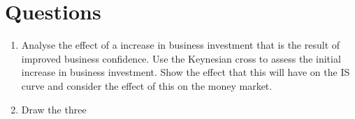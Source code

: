 \documentclass{article}
\begin{document}
\section{Questions}
\begin{enumerate}
\item Analyse the effect of a increase in business investment that is the result of improved business confidence.  Use the Keynesian cross to assess the initial increase in business investment. Show the effect that this will have on the IS curve and consider the effect of this on the money market. 
\item Draw the three 

\end{enumerate}
\end{document}
